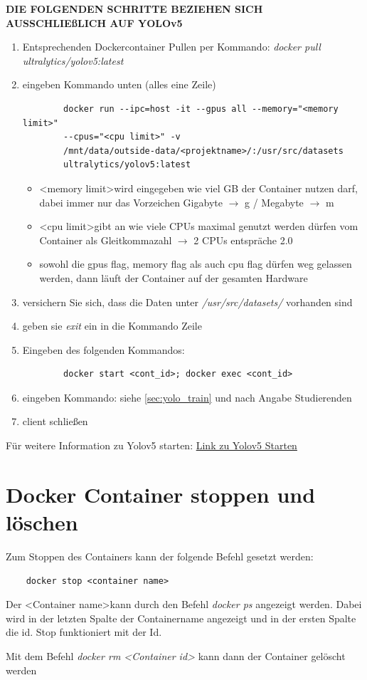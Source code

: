 \textbf{DIE FOLGENDEN SCHRITTE BEZIEHEN SICH AUSSCHLIEßLICH AUF YOLOv5}
\begin{enumerate}
    \item Entsprechenden Dockercontainer Pullen per Kommando: \textit{docker pull ultralytics/yolov5:latest} 
    \item eingeben Kommando unten (alles eine Zeile)
    \begin{verbatim}
        docker run --ipc=host -it --gpus all --memory="<memory limit>"
        --cpus="<cpu limit>" -v 
        /mnt/data/outside-data/<projektname>/:/usr/src/datasets
        ultralytics/yolov5:latest
    \end{verbatim}
    \begin{itemize}
        \item \textless memory limit\textgreater  wird eingegeben wie viel GB der Container nutzen darf, dabei immer nur das Vorzeichen Gigabyte  $\rightarrow$ g / Megabyte $\rightarrow$ m
        \item \textless cpu limit\textgreater gibt an wie viele CPUs maximal genutzt werden dürfen vom Container als Gleitkommazahl $\rightarrow$ 2 CPUs entspräche 2.0
        \item sowohl die gpus flag, memory flag als auch cpu flag dürfen weg gelassen werden, dann läuft der Container auf der gesamten Hardware    
    \end{itemize}
    \item versichern Sie sich, dass die Daten unter \textit{/usr/src/datasets/} vorhanden sind
    \item geben sie \textit{exit} ein in die Kommando Zeile 
    \item Eingeben des folgenden Kommandos:
    \begin{verbatim}
        docker start <cont_id>; docker exec <cont_id>
    \end{verbatim}
    \item eingeben Kommando: siehe \autoref{sec:yolo_train} und nach Angabe Studierenden
    \item client schließen

\end{enumerate}
Für weitere Information zu Yolov5 starten: \href{https://github.com/ultralytics/yolov5/wiki/Docker-Quickstart}{Link zu Yolov5 Starten} 

\section{Docker Container stoppen und löschen}
Zum Stoppen des Containers kann der folgende Befehl gesetzt werden:
\begin{verbatim}
    docker stop <container name>
\end{verbatim}
Der \textless Container name\textgreater kann durch den Befehl \textit{docker ps} angezeigt werden. Dabei wird in der letzten Spalte der Containername angezeigt und in der ersten Spalte die id. Stop funktioniert mit der Id.

Mit dem Befehl \textit{docker rm \textless Container id\textgreater} kann dann der Container gelöscht werden